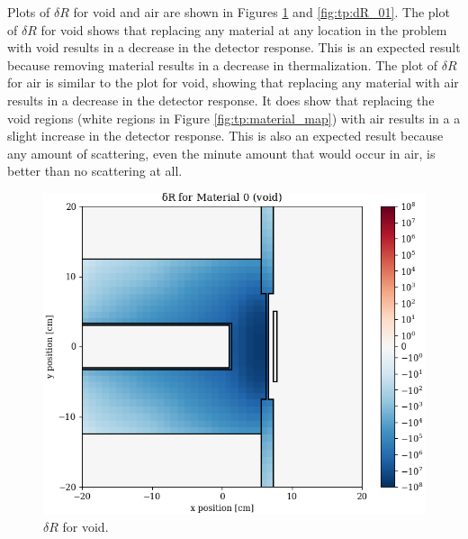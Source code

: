Plots of $\delta R$ for void and air are shown in Figures \ref{fig:tp:dR_00} and \ref{fig:tp:dR_01}.
The plot of $\delta R$ for void shows that replacing any material at any location in the problem with void results in a decrease in the detector response.
This is an expected result because removing material results in a decrease in thermalization.
The plot of $\delta R$ for air is similar to the plot for void, showing that replacing any material with air results in a decrease in the detector response.
It does show that replacing the void regions (white regions in Figure \ref{fig:tp:material_map}) with air results in a a slight increase in the detector response.
This is also an expected result because any amount of scattering, even the minute amount that would occur in air, is better than no scattering at all.

\begin{figure}
  \begin{minipage}{0.49\linewidth}
    \centering
    \includegraphics[width=\linewidth]{content/testprob/dR_00.png}
    \caption{$\delta R$ for void.}
    \label{fig:tp:dR_00}
  \end{minipage}
  \hfill
  \begin{minipage}{0.49\linewidth}
    \centering

\end{minipage}
\end{figure}
